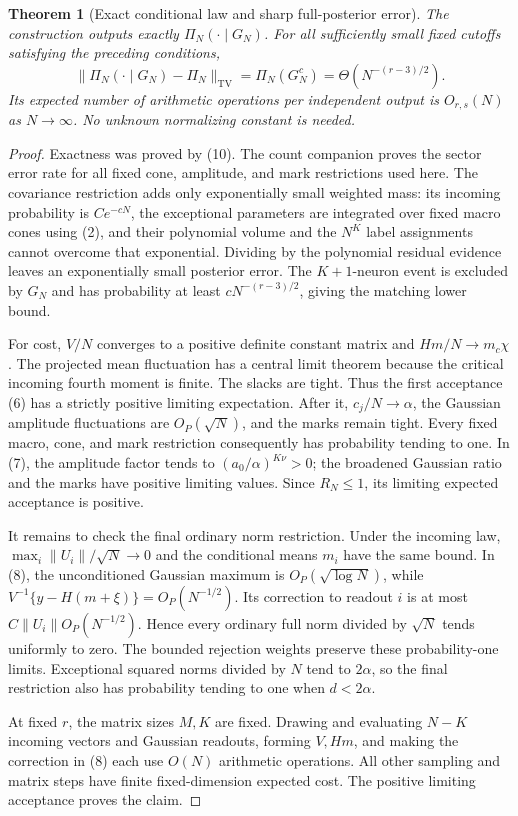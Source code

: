 \documentclass[11pt]{article}
\newtheorem{theorem}{Theorem}\newtheorem{lemma}[theorem]{Lemma}
\newcommand{\TV}{\mathrm{TV}}\newcommand{\one}{\mathbf1}
\begin{document}
\begin{theorem}[Exact conditional law and sharp full-posterior error]
The construction outputs exactly $\Pi_N(\cdot\mid G_N)$. For all
sufficiently small fixed cutoffs satisfying the preceding conditions,
\[
 \|\Pi_N(\cdot\mid G_N)-\Pi_N\|_{\TV}
                  =\Pi_N(G_N^c)=\Theta(N^{-(r-3)/2}).    \tag{11}
\]
Its expected number of arithmetic operations per independent output is
$O_{r,s}(N)$ as $N\to\infty$. No unknown normalizing constant is needed.
\end{theorem}
\begin{proof}
Exactness was proved by (10). The count companion proves the sector
error rate for all fixed cone, amplitude, and mark restrictions used
here. The covariance restriction adds only exponentially small weighted
mass: its incoming probability is $Ce^{-cN}$, the exceptional parameters
are integrated over fixed macro cones using (2), and their polynomial
volume and the $N^K$ label assignments cannot overcome that exponential.
Dividing by the polynomial residual evidence leaves an exponentially
small posterior error. The $K+1$-neuron event is excluded by $G_N$ and
has probability at least $cN^{-(r-3)/2}$, giving the matching lower bound.

For cost, $V/N$ converges to a positive definite constant matrix and
$Hm/N\to m_c\chi$. The projected mean fluctuation has a central limit
theorem because the critical incoming fourth moment is finite. The
slacks are tight. Thus the first acceptance (6) has a strictly positive
limiting expectation. After it, $c_j/N\to\alpha$, the Gaussian amplitude
fluctuations are $O_P(\sqrt N)$, and the marks remain tight. Every fixed
macro, cone, and mark restriction consequently has probability tending
to one. In (7), the amplitude factor tends to $(a_0/\alpha)^{K\nu}>0$;
the broadened Gaussian ratio and the marks have positive limiting
values. Since $R_N\le1$, its limiting expected acceptance is positive.

It remains to check the final ordinary norm restriction. Under the
incoming law, $\max_i\|U_i\|/\sqrt N\to0$ and the conditional means
$m_i$ have the same bound. In (8), the unconditioned Gaussian maximum
is $O_P(\sqrt{\log N})$, while
$V^{-1}\{y-H(m+\xi)\}=O_P(N^{-1/2})$. Its correction to readout $i$
is at most $C\|U_i\|O_P(N^{-1/2})$. Hence every ordinary full norm
divided by $\sqrt N$ tends uniformly to zero. The bounded rejection
weights preserve these probability-one limits. Exceptional squared
norms divided by $N$ tend to $2\alpha$, so the final restriction also
has probability tending to one when $d<2\alpha$.

At fixed $r$, the matrix sizes $M,K$ are fixed. Drawing and evaluating
$N-K$ incoming vectors and Gaussian readouts, forming $V,Hm$, and making
the correction in (8) each use $O(N)$ arithmetic operations. All other
sampling and matrix steps have finite fixed-dimension expected cost.
The positive limiting acceptance proves the claim.
\end{proof}
\end{document}
